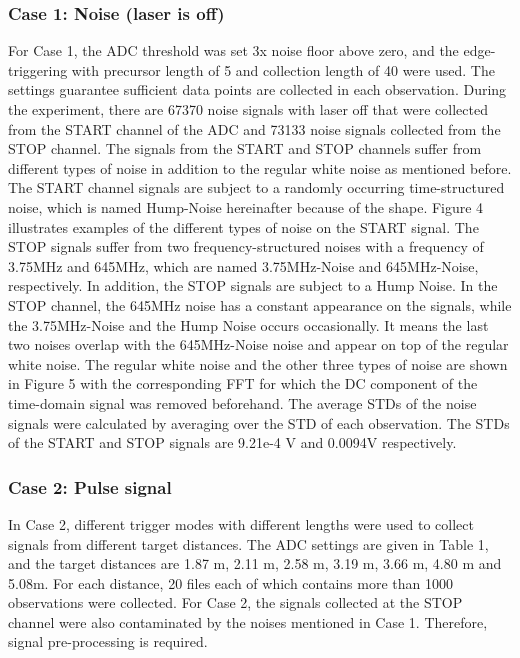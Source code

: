 \subsubsection{Case 1: Noise (laser is off)}
For Case 1, the ADC threshold was set 3x noise floor above zero, and the edge-triggering with precursor length of 5 and collection length of 40 were used. The settings guarantee sufficient data points are collected in each observation. During the experiment, there are 67370 noise signals with laser off that were collected from the START channel of the ADC and 73133 noise signals collected from the STOP channel. The signals from the START and STOP channels suffer from different types of noise in addition to the regular white noise as mentioned before. The START channel signals are subject to a randomly occurring time-structured noise, which is named Hump-Noise hereinafter because of the shape. Figure 4 illustrates examples of the different types of noise on the START signal.
The STOP signals suffer from two frequency-structured noises with a frequency of 3.75MHz and 645MHz, which are named 3.75MHz-Noise and 645MHz-Noise, respectively. In addition, the STOP signals are subject to a Hump Noise. In the STOP channel, the 645MHz noise has a constant appearance on the signals, while the 3.75MHz-Noise and the Hump Noise occurs occasionally. It means the last two noises overlap with the 645MHz-Noise noise and appear on top of the regular white noise. The regular white noise and the other three types of noise are shown in Figure 5 with the corresponding FFT for which the DC component of the time-domain signal was removed beforehand. The average STDs of the noise signals were calculated by averaging over the STD of each observation. The STDs of the START and STOP signals are 9.21e-4 V and 0.0094V respectively.
\subsubsection{Case 2: Pulse signal}
In Case 2, different trigger modes with different lengths were used to collect signals from different target distances. The ADC settings are given in Table 1, and the target distances are 1.87 m, 2.11 m, 2.58 m, 3.19 m, 3.66 m, 4.80 m and 5.08m. For each distance, 20 files each of which contains more than 1000 observations were collected.  
For Case 2, the signals collected at the STOP channel were also contaminated by the noises mentioned in Case 1. Therefore, signal pre-processing is required.

